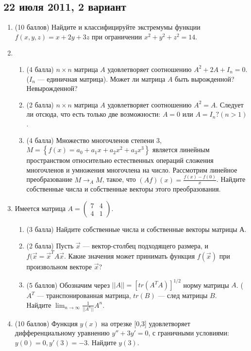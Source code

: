 \documentclass[pdftex,12pt,a4paper]{article}
\begin{document}
\subsection{22 июля 2011, 2 вариант}
\begin{enumerate}
\item (10 баллов) Найдите и классифицируйте экстремумы функции $f(x,y,z)=x+2y+3z$ при ограничении $x^2+y^2+z^2=14$.\\
\item \begin{enumerate}
\item (4 балла) $n\times n$ матрица $A$ удовлетворяет соотношению $A^2+2A+I_n=0$. ($I_n$ --- единичная матрица). Может ли матрица $A$ быть вырожденной? Невырожденной?
\item (2 балла) $n\times n$ матрица $A$ удовлетворяет соотношению $A^2=A$. Следует ли отсюда, что  есть только две возможности: $A=0$ или $A=I_n? (n>1)$.
\item (4 балла) Множество многочленов степени 3, $M=\left\{f(x)=a_0+a_1x+a_2x^2+a_3x^3\right\}$ является линейным пространством относительно естественных операций сложения многочленов и умножения многочлена на число. Рассмотрим линейное преобразование $M\longrightarrow_A M$, такое, что $(Af)(x)=\frac{f(x)-f(0)}{x}$. Найдите собственные числа и собственные векторы этого преобразования.
\end{enumerate}
\item Имеется матрица $A=\left(\begin{array}{cc}
7 & 4\\
4 & 1
\end{array}\right)$.
\begin{enumerate}
\item (3 балла) Найдите собственные числа и собственные векторы матрицы А.
\item (2 балла) Пусть $\vec{x}$ --- вектор-столбец подходящего размера, и $f(\vec{x}=\vec{x}^T A \vec{x}$. Какие значения может принимать функция $f(\vec{x})$ при произвольном векторе $\vec{x}$?
\item  (5 баллов) Обозначим через $||A||=[tr(A^TA)]^{1/2}$ норму матрицы $A$. ($A^T$ --- транспонированная матрица, $tr(B)$ --- след матрицы $B$.\\
Найдите $\lim_{n\to \infty}\frac{1}{||A^n||} A^n$.
\end{enumerate}
\item (10 баллов) Функция $y(x)$ на отрезке [0,3] удовлетворяет дифференциальному уравнению $y''+3y'=0$, с граничными условиями: $y(0)=0, y'(3)=-3$. Найдите $y(3)$.\\

\end{enumerate}
\end{document}
